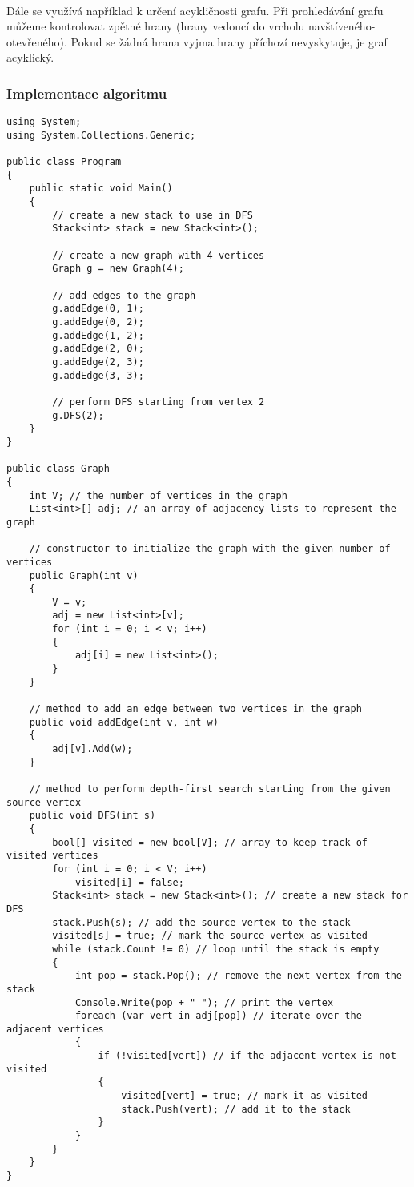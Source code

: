 \documentclass[12pt, titlepage, a4paper]{article}
\begin{document}
\paragraph{}
Dále se využívá například k určení acykličnosti grafu. Při prohledávání grafu můžeme kontrolovat zpětné hrany (hrany 
vedoucí do vrcholu navštíveného-otevřeného). Pokud se žádná hrana vyjma hrany příchozí 
nevyskytuje, je graf acyklický.

\newpage
\subsubsection{Implementace algoritmu}
\begin{lstlisting}
using System;
using System.Collections.Generic;

public class Program
{
    public static void Main()
    {
        // create a new stack to use in DFS
        Stack<int> stack = new Stack<int>();

        // create a new graph with 4 vertices
        Graph g = new Graph(4);

        // add edges to the graph
        g.addEdge(0, 1);
        g.addEdge(0, 2);
        g.addEdge(1, 2);
        g.addEdge(2, 0);
        g.addEdge(2, 3);
        g.addEdge(3, 3);

        // perform DFS starting from vertex 2
        g.DFS(2);
    }
}

public class Graph
{
    int V; // the number of vertices in the graph
    List<int>[] adj; // an array of adjacency lists to represent the graph

    // constructor to initialize the graph with the given number of vertices
    public Graph(int v)
    {
        V = v;
        adj = new List<int>[v];
        for (int i = 0; i < v; i++)
        {
            adj[i] = new List<int>();
        }
    }

    // method to add an edge between two vertices in the graph
    public void addEdge(int v, int w)
    {
        adj[v].Add(w);
    }

    // method to perform depth-first search starting from the given source vertex
    public void DFS(int s)
    {
        bool[] visited = new bool[V]; // array to keep track of visited vertices
        for (int i = 0; i < V; i++)
            visited[i] = false;
        Stack<int> stack = new Stack<int>(); // create a new stack for DFS
        stack.Push(s); // add the source vertex to the stack
        visited[s] = true; // mark the source vertex as visited
        while (stack.Count != 0) // loop until the stack is empty
        {
            int pop = stack.Pop(); // remove the next vertex from the stack
            Console.Write(pop + " "); // print the vertex
            foreach (var vert in adj[pop]) // iterate over the adjacent vertices
            {
                if (!visited[vert]) // if the adjacent vertex is not visited
                {
                    visited[vert] = true; // mark it as visited
                    stack.Push(vert); // add it to the stack
                }
            }
        }
    }
}
\end{lstlisting}
\clearpage
\end{document}
